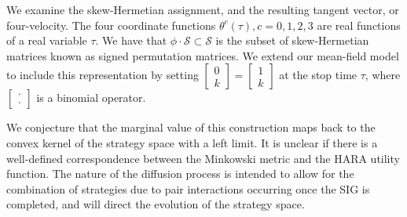 \documentclass[11pt]{article}
\theoremstyle{definition}
\newcommand{\mcS}{\mathcal{S}}
\begin{document}
We examine the skew-Hermetian assignment, and the resulting tangent vector, or four-velocity. 
The four coordinate functions $\theta^c (\tau), c = 0, 1, 2, 3$ are real
functions of a real variable $\tau$. 
We have that $\phi\cdot \mcS\subset \mcS$ is the subset of skew-Hermetian matrices known as signed
permutation matrices. We extend our mean-field model to include this
representation by setting $\begin{bmatrix}0 \\ k\end{bmatrix} = \begin{bmatrix}1
\\ k\end{bmatrix}$ at the stop time $\tau$, where $\begin{bmatrix} \cdot \\
\cdot\end{bmatrix}$ is a binomial operator.

We conjecture that the marginal value of this construction maps back to the
convex kernel of the strategy space with a left limit. It is unclear if there is
a well-defined correspondence between the Minkowski metric and the HARA utility
function. The nature of the diffusion process is intended to allow for the
combination of strategies due to pair interactions occurring once the SIG is
completed, and will direct the evolution of the strategy space.
\end{document}
